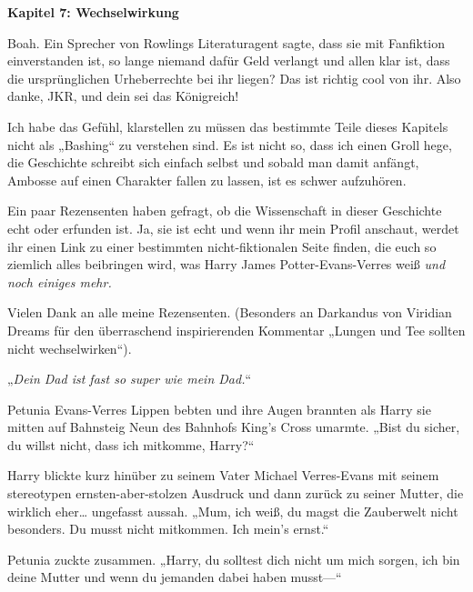 

\hypertarget{wechselwirkung}{%

\textbf{Kapitel 7: Wechselwirkung}

Boah. Ein Sprecher von Rowlings Literaturagent sagte, dass sie mit Fanfiktion einverstanden ist, so lange niemand dafür Geld verlangt und allen klar ist, dass die ursprünglichen Urheberrechte bei ihr liegen? Das ist richtig cool von ihr. Also danke, JKR, und dein sei das Königreich!

\later

Ich habe das Gefühl, klarstellen zu müssen das bestimmte Teile dieses Kapitels nicht als „Bashing“ zu verstehen sind. Es ist nicht so, dass ich einen Groll hege, die Geschichte schreibt sich einfach selbst und sobald man damit anfängt, Ambosse auf einen Charakter fallen zu lassen, ist es schwer aufzuhören.

Ein paar Rezensenten haben gefragt, ob die Wissenschaft in dieser Geschichte echt oder erfunden ist. Ja, sie ist echt und wenn ihr mein Profil anschaut, werdet ihr einen Link zu einer bestimmten nicht-fiktionalen Seite finden, die euch so ziemlich alles beibringen wird, was Harry James Potter-Evans-Verres weiß \emph{und noch einiges mehr.}

Vielen Dank an alle meine Rezensenten. (Besonders an Darkandus von Viridian Dreams für den überraschend inspirierenden Kommentar „Lungen und Tee sollten nicht wechselwirken“).

\later

„\emph{Dein Dad ist fast so super wie mein Dad.}“

\later

Petunia Evans-Verres Lippen bebten und ihre Augen brannten als Harry sie mitten auf Bahnsteig Neun des Bahnhofs King's Cross umarmte. „Bist du sicher, du willst nicht, dass ich mitkomme, Harry?“

Harry blickte kurz hinüber zu seinem Vater Michael Verres-Evans mit seinem stereotypen ernsten-aber-stolzen Ausdruck und dann zurück zu seiner Mutter, die wirklich eher… ungefasst aussah. „Mum, ich weiß, du magst die Zauberwelt nicht besonders. Du musst nicht mitkommen. Ich mein's ernst.“

Petunia zuckte zusammen. „Harry, du solltest dich nicht um mich sorgen, ich bin deine Mutter und wenn du jemanden dabei haben musst—“

}
